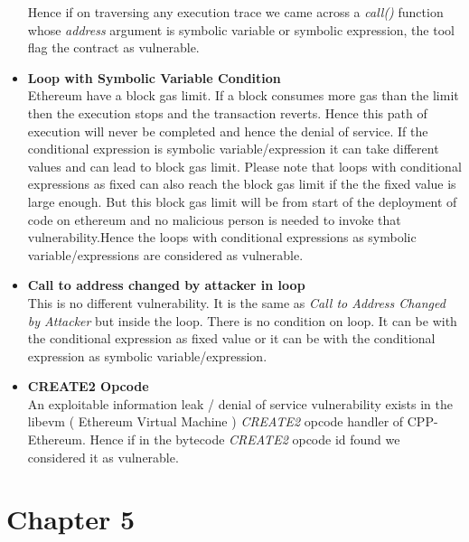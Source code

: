 \documentclass{article}
\begin{document}
\begin{itemize}
\begin{itemize}
    \end{itemize}
    Hence if on traversing any execution trace we came across a \emph{call()} function whose \emph{address} argument is symbolic variable or symbolic expression, the tool flag the contract as vulnerable.\\
    \item \textbf{Loop with Symbolic Variable Condition}\\
    Ethereum have a block gas limit. If a block consumes more gas than the limit then the execution stops and the transaction reverts. Hence this path of execution will never be completed and hence the denial of service. If the conditional expression is symbolic variable/expression it can take different values and can lead to block gas limit. Please note that loops with conditional expressions as fixed can also reach the block gas limit if the the fixed value is large enough. But this block gas limit will be from start of the deployment of code on ethereum and no malicious person is needed to invoke that vulnerability.Hence the loops with conditional expressions as symbolic variable/expressions are considered as vulnerable.
    
    \item \textbf{Call to address changed by attacker in loop}\\
    This is no different vulnerability. It is the same as \emph{Call to Address Changed by Attacker} but inside the loop. There is no condition on loop. It can be with the conditional expression as fixed value or it can be with the conditional expression as symbolic variable/expression.
    \newpage
    \item \textbf{CREATE2 Opcode}\\
    An exploitable information leak / denial of service vulnerability exists in the libevm ( Ethereum Virtual Machine ) \emph{CREATE2} opcode handler of CPP-Ethereum. Hence if in the bytecode \emph{CREATE2} opcode id found we considered it as vulnerable.
\end{itemize}

\newpage
\section*{Chapter 5}
\end{document}

